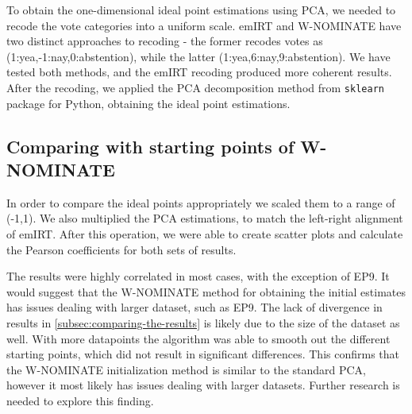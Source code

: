 \documentclass[a4paper,12pt]{report}
\begin{document}
    To obtain the one-dimensional ideal point estimations using PCA, we needed to recode the vote categories into a
    uniform scale.
    emIRT and W-NOMINATE have two distinct approaches to recoding - the former recodes votes as
    (1:yea,-1:nay,0:abstention), while the latter (1:yea,6:nay,9:abstention). We have tested both methods, and the
    emIRT recoding produced more coherent results. After the recoding, we applied the PCA decomposition method from
    \texttt{sklearn} package for Python, obtaining the ideal point estimations.

    \subsection{Comparing with starting points of W-NOMINATE}\label{subsec:comparing-with-starting-points-of-w-nominate}
    In order to compare the ideal points appropriately we scaled them to a range of (-1,1). We also multiplied the
    PCA estimations, to match the left-right alignment of emIRT. After this operation, we were able to create scatter
    plots and calculate the Pearson coefficients for both sets
    of results.

    The results were highly correlated in most cases, with the exception of EP9. It would suggest that
    the W-NOMINATE method for obtaining the initial estimates has issues dealing with larger dataset, such as EP9.
    The lack of divergence in results in
    \ref{subsec:comparing-the-results} is likely due to the size of the dataset as well. With more datapoints the
    algorithm was able to smooth out the different starting points, which did not result in significant differences.
    This confirms that the W-NOMINATE initialization method is similar to the standard PCA, however it most likely
    has issues dealing with larger datasets. Further research is needed to explore this finding.
\end{document}
